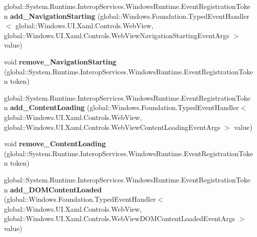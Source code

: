 \begin{DoxyCompactItemize}
global\+::\+System.\+Runtime.\+Interop\+Services.\+Windows\+Runtime.\+Event\+Registration\+Token {\bfseries add\+\_\+\+Navigation\+Starting} (global\+::\+Windows.\+Foundation.\+Typed\+Event\+Handler$<$ global\+::\+Windows.\+U\+I.\+Xaml.\+Controls.\+Web\+View, global\+::\+Windows.\+U\+I.\+Xaml.\+Controls.\+Web\+View\+Navigation\+Starting\+Event\+Args $>$ value)
\item 
\mbox{\label{interface_windows_1_1_u_i_1_1_xaml_1_1_controls_1_1_i_web_view2_a669f35cd29b2d8961a6c132444a73ddf}} 
void {\bfseries remove\+\_\+\+Navigation\+Starting} (global\+::\+System.\+Runtime.\+Interop\+Services.\+Windows\+Runtime.\+Event\+Registration\+Token token)
\item 
\mbox{\label{interface_windows_1_1_u_i_1_1_xaml_1_1_controls_1_1_i_web_view2_abc203b6881b1b76a4b7672b7fb427bda}} 
global\+::\+System.\+Runtime.\+Interop\+Services.\+Windows\+Runtime.\+Event\+Registration\+Token {\bfseries add\+\_\+\+Content\+Loading} (global\+::\+Windows.\+Foundation.\+Typed\+Event\+Handler$<$ global\+::\+Windows.\+U\+I.\+Xaml.\+Controls.\+Web\+View, global\+::\+Windows.\+U\+I.\+Xaml.\+Controls.\+Web\+View\+Content\+Loading\+Event\+Args $>$ value)
\item 
\mbox{\label{interface_windows_1_1_u_i_1_1_xaml_1_1_controls_1_1_i_web_view2_ae842c5ef69d1e7a4cea4c4e546878fc0}} 
void {\bfseries remove\+\_\+\+Content\+Loading} (global\+::\+System.\+Runtime.\+Interop\+Services.\+Windows\+Runtime.\+Event\+Registration\+Token token)
\item 
\mbox{\label{interface_windows_1_1_u_i_1_1_xaml_1_1_controls_1_1_i_web_view2_ad7b79a31e2034f7e2d82141d4fb98882}} 
global\+::\+System.\+Runtime.\+Interop\+Services.\+Windows\+Runtime.\+Event\+Registration\+Token {\bfseries add\+\_\+\+D\+O\+M\+Content\+Loaded} (global\+::\+Windows.\+Foundation.\+Typed\+Event\+Handler$<$ global\+::\+Windows.\+U\+I.\+Xaml.\+Controls.\+Web\+View, global\+::\+Windows.\+U\+I.\+Xaml.\+Controls.\+Web\+View\+D\+O\+M\+Content\+Loaded\+Event\+Args $>$ value)
\item 
\mbox{\label{interface_windows_1_1_u_i_1_1_xaml_1_1_controls_1_1_i_web_view2_a4826b2efe9b800c1e85e3a78e742e78c}} 

\end{DoxyCompactItemize}
